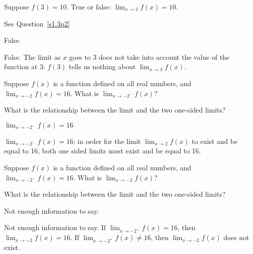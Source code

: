 \begin{question}
Suppose $f(3)=10$. True or false: $\displaystyle\lim_{x \rightarrow 3} f(x)=10$.
\end{question}
\begin{hint}
See Question~\ref{s1.3p2}
\end{hint}
\begin{answer}
False
\end{answer}
\begin{solution}
False. The limit as $x$ goes to 3 does not take into account the value of the function at 3: $f(3)$ tells us nothing about $\displaystyle\lim_{x \rightarrow 3} f(x)$.
\end{solution}


\begin{Mquestion}
Suppose $f(x)$ is a function defined on all real numbers, and $\displaystyle\lim_{x \rightarrow -2} f(x)=16$. What is $\displaystyle\lim_{x \rightarrow -2^-} f(x)$?
\end{Mquestion}
\begin{hint}
What is the relationship  between the limit and the two one-sided limits?
\end{hint}
\begin{answer}
$\displaystyle\lim_{x \rightarrow -2^-} f(x)=16$
\end{answer}
\begin{solution}
$\displaystyle\lim_{x \rightarrow -2^-} f(x)=16$: in order for the limit $\displaystyle\lim_{x \rightarrow 2} f(x)$ to exist and be equal to 16, both one sided limits must exist and be equal to 16.
\end{solution}

\begin{Mquestion}
Suppose $f(x)$ is a function defined on all real numbers, and $\displaystyle\lim_{x \rightarrow -2^-} f(x)=16$. What is $\displaystyle\lim_{x \rightarrow -2} f(x)$?
\end{Mquestion}
\begin{hint}
What is the relationship  between the limit and the two one-sided limits?
\end{hint}
\begin{answer}
Not enough information to say.
\end{answer}
\begin{solution}
Not enough information to say.
If $\displaystyle\lim_{x \rightarrow -2^+} f(x)=16$, then
 $\displaystyle\lim_{x \rightarrow -2} f(x)=16$.
If $\displaystyle\lim_{x \rightarrow -2^+} f(x)\neq 16$, then
 $\displaystyle\lim_{x \rightarrow -2} f(x)$ does not exist.
\end{solution}

